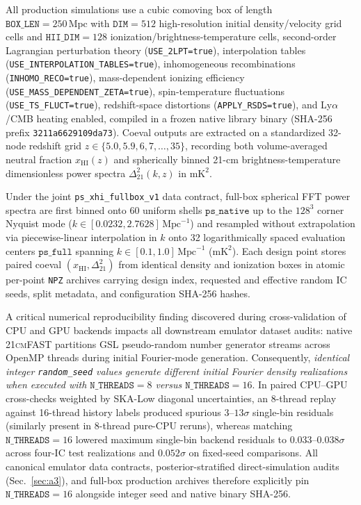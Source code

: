 \documentclass[aps,prd,reprint,superscriptaddress,nofootinbib,amsmath,amssymb,floatfix,longbibliography]{revtex4-2}
\begin{document}
All production simulations use a cubic comoving box of length $\texttt{BOX\_LEN}=250\,\mathrm{Mpc}$ with $\texttt{DIM}=512$ high-resolution initial density/velocity grid cells and $\texttt{HII\_DIM}=128$ ionization/brightness-temperature cells, second-order Lagrangian perturbation theory (\texttt{USE\_2LPT=true}), interpolation tables (\texttt{USE\_INTERPOLATION\_TABLES=true}), inhomogeneous recombinations (\texttt{INHOMO\_RECO=true}), mass-dependent ionizing efficiency (\texttt{USE\_MASS\_DEPENDENT\_ZETA=true}), spin-temperature fluctuations (\texttt{USE\_TS\_FLUCT=true}), redshift-space distortions (\texttt{APPLY\_RSDS=true}), and Ly$\alpha$/CMB heating enabled, compiled in a frozen native library binary (SHA-256 prefix \texttt{3211a6629109da73}). Coeval outputs are extracted on a standardized 32-node redshift grid $z \in \{5.0, 5.9, 6, 7, \dots, 35\}$, recording both volume-averaged neutral fraction $x_{\mathrm{HI}}(z)$ and spherically binned 21-cm brightness-temperature dimensionless power spectra $\Delta^2_{21}(k,z)$ in $\mathrm{mK}^2$.

Under the joint \texttt{ps\_xhi\_fullbox\_v1} data contract, full-box spherical FFT power spectra are first binned onto 60 uniform shells $\texttt{ps\_native}$ up to the $128^3$ corner Nyquist mode ($k \in [0.0232, 2.7628]\,\mathrm{Mpc}^{-1}$) and resampled without extrapolation via piecewise-linear interpolation in $k$ onto 32 logarithmically spaced evaluation centers $\texttt{ps\_full}$ spanning $k \in [0.1, 1.0]\,\mathrm{Mpc}^{-1}$ ($\mathrm{mK}^2$). Each design point stores paired coeval $(x_{\mathrm{HI}}, \Delta^2_{21})$ from identical density and ionization boxes in atomic per-point \texttt{NPZ} archives carrying design index, requested and effective random IC seeds, split metadata, and configuration SHA-256 hashes.

A critical numerical reproducibility finding discovered during cross-validation of CPU and GPU backends impacts all downstream emulator dataset audits: native \textsc{21cmFAST} partitions GSL pseudo-random number generator streams across OpenMP threads during initial Fourier-mode generation. Consequently, \emph{identical integer \texttt{random\_seed} values generate different initial Fourier density realizations when executed with $\texttt{N\_THREADS}=8$ versus $\texttt{N\_THREADS}=16$}. In paired CPU--GPU cross-checks weighted by SKA-Low diagonal uncertainties, an 8-thread replay against 16-thread history labels produced spurious $3\text{--}13\sigma$ single-bin residuals (similarly present in 8-thread pure-CPU reruns), whereas matching $\texttt{N\_THREADS}=16$ lowered maximum single-bin backend residuals to $0.033\text{--}0.038\sigma$ across four-IC test realizations and $0.052\sigma$ on fixed-seed comparisons. All canonical emulator data contracts, posterior-stratified direct-simulation audits (Sec.~\ref{sec:a3}), and full-box production archives therefore explicitly pin $\texttt{N\_THREADS}=16$ alongside integer seed and native binary SHA-256.
\end{document}
